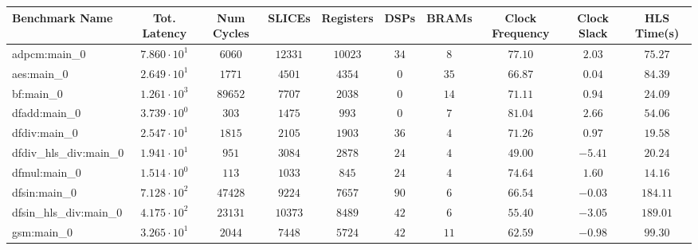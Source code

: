 \begin{tabular}{|l|c|c|c|c|c|c|c|c|c|}
\hline
Benchmark Name          & Tot. Latency           & Num Cycles & SLICEs    & Registers & DSPs    & BRAMs   & Clock Frequency & Clock Slack & HLS Time(s) \\
\hline
adpcm:main\_0           & $ 7.860 \cdot 10^{1} $ & $ 6060   $ & $ 12331 $ & $ 10023 $ & $ 34  $ & $ 8   $ & $ 77.10       $ & $ 2.03    $ & $ 75.27   $ \\
aes:main\_0             & $ 2.649 \cdot 10^{1} $ & $ 1771   $ & $ 4501  $ & $ 4354  $ & $ 0   $ & $ 35  $ & $ 66.87       $ & $ 0.04    $ & $ 84.39   $ \\
bf:main\_0              & $ 1.261 \cdot 10^{3} $ & $ 89652  $ & $ 7707  $ & $ 2038  $ & $ 0   $ & $ 14  $ & $ 71.11       $ & $ 0.94    $ & $ 24.09   $ \\
dfadd:main\_0           & $ 3.739 \cdot 10^{0} $ & $ 303    $ & $ 1475  $ & $ 993   $ & $ 0   $ & $ 7   $ & $ 81.04       $ & $ 2.66    $ & $ 54.06   $ \\
dfdiv:main\_0           & $ 2.547 \cdot 10^{1} $ & $ 1815   $ & $ 2105  $ & $ 1903  $ & $ 36  $ & $ 4   $ & $ 71.26       $ & $ 0.97    $ & $ 19.58   $ \\
dfdiv\_hls\_div:main\_0 & $ 1.941 \cdot 10^{1} $ & $ 951    $ & $ 3084  $ & $ 2878  $ & $ 24  $ & $ 4   $ & $ 49.00       $ & $ -5.41   $ & $ 20.24   $ \\
dfmul:main\_0           & $ 1.514 \cdot 10^{0} $ & $ 113    $ & $ 1033  $ & $ 845   $ & $ 24  $ & $ 4   $ & $ 74.64       $ & $ 1.60    $ & $ 14.16   $ \\
dfsin:main\_0           & $ 7.128 \cdot 10^{2} $ & $ 47428  $ & $ 9224  $ & $ 7657  $ & $ 90  $ & $ 6   $ & $ 66.54       $ & $ -0.03   $ & $ 184.11  $ \\
dfsin\_hls\_div:main\_0 & $ 4.175 \cdot 10^{2} $ & $ 23131  $ & $ 10373 $ & $ 8489  $ & $ 42  $ & $ 6   $ & $ 55.40       $ & $ -3.05   $ & $ 189.01  $ \\
gsm:main\_0             & $ 3.265 \cdot 10^{1} $ & $ 2044   $ & $ 7448  $ & $ 5724  $ & $ 42  $ & $ 11  $ & $ 62.59       $ & $ -0.98   $ & $ 99.30   $ \\

\end{tabular}
